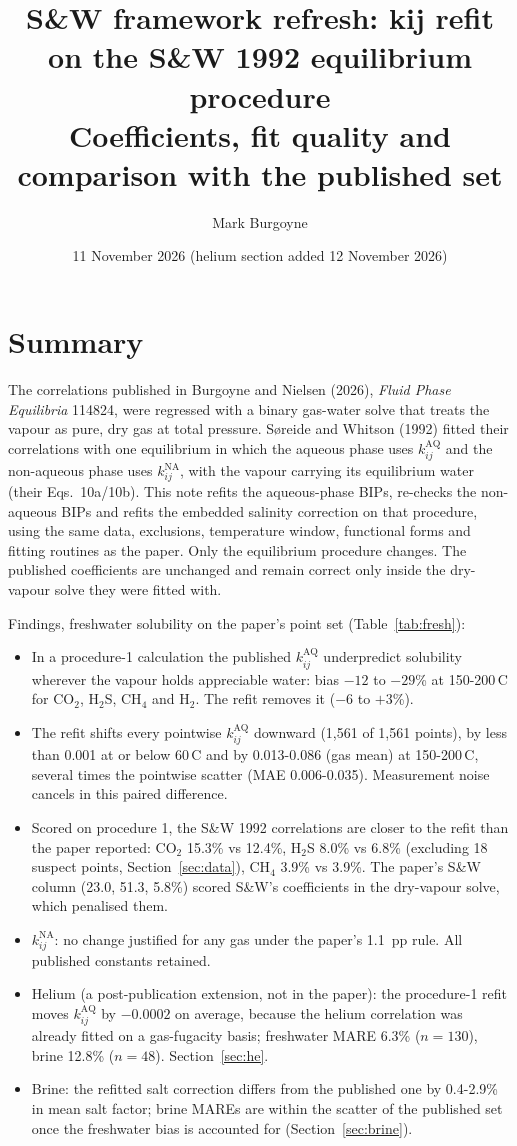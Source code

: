 \documentclass[10pt,a4paper]{article}
\title{S\&W framework refresh: kij refit on the S\&W 1992 equilibrium procedure\\[2pt]\large Coefficients, fit quality and comparison with the published set}
\author{Mark Burgoyne}
\date{11 November 2026 (helium section added 12 November 2026)}
\begin{document}
\maketitle

\section{Summary}

The correlations published in Burgoyne and Nielsen (2026), \emph{Fluid Phase Equilibria} 114824, were regressed with a binary gas-water solve that treats the vapour as pure, dry gas at total pressure. Søreide and Whitson (1992) fitted their correlations with one equilibrium in which the aqueous phase uses $k_{ij}^{\mathrm{AQ}}$ and the non-aqueous phase uses $k_{ij}^{\mathrm{NA}}$, with the vapour carrying its equilibrium water (their Eqs.~10a/10b). This note refits the aqueous-phase BIPs, re-checks the non-aqueous BIPs and refits the embedded salinity correction on that procedure, using the same data, exclusions, temperature window, functional forms and fitting routines as the paper. Only the equilibrium procedure changes. The published coefficients are unchanged and remain correct only inside the dry-vapour solve they were fitted with.

Findings, freshwater solubility on the paper's point set (Table~\ref{tab:fresh}):
\begin{itemize}
\item In a procedure-1 calculation the published $k_{ij}^{\mathrm{AQ}}$ underpredict solubility wherever the vapour holds appreciable water: bias $-12$ to $-29$\% at 150-200\,\textdegree C for CO$_2$, H$_2$S, CH$_4$ and H$_2$. The refit removes it ($-6$ to $+3$\%).
\item The refit shifts every pointwise $k_{ij}^{\mathrm{AQ}}$ downward (1,561 of 1,561 points), by less than 0.001 at or below 60\,\textdegree C and by 0.013-0.086 (gas mean) at 150-200\,\textdegree C, several times the pointwise scatter (MAE 0.006-0.035). Measurement noise cancels in this paired difference.
\item Scored on procedure 1, the S\&W 1992 correlations are closer to the refit than the paper reported: CO$_2$ 15.3\% vs 12.4\%, H$_2$S 8.0\% vs 6.8\% (excluding 18 suspect points, Section~\ref{sec:data}), CH$_4$ 3.9\% vs 3.9\%. The paper's S\&W column (23.0, 51.3, 5.8\%) scored S\&W's coefficients in the dry-vapour solve, which penalised them.
\item $k_{ij}^{\mathrm{NA}}$: no change justified for any gas under the paper's 1.1~pp rule. All published constants retained.
\item Helium (a post-publication extension, not in the paper): the procedure-1 refit moves $k_{ij}^{\mathrm{AQ}}$ by $-0.0002$ on average, because the helium correlation was already fitted on a gas-fugacity basis; freshwater MARE 6.3\% ($n = 130$), brine 12.8\% ($n = 48$). Section~\ref{sec:he}.
\item Brine: the refitted salt correction differs from the published one by 0.4-2.9\% in mean salt factor; brine MAREs are within the scatter of the published set once the freshwater bias is accounted for (Section~\ref{sec:brine}).
\end{itemize}
\end{document}
